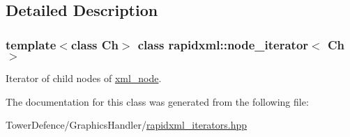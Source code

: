 \subsection{Detailed Description}
\subsubsection*{template$<$class Ch$>$\newline
class rapidxml\+::node\+\_\+iterator$<$ Ch $>$}

Iterator of child nodes of \mbox{\hyperlink{classrapidxml_1_1xml__node}{xml\+\_\+node}}. 

The documentation for this class was generated from the following file\+:\begin{DoxyCompactItemize}
\item 
Tower\+Defence/\+Graphics\+Handler/\mbox{\hyperlink{rapidxml__iterators_8hpp}{rapidxml\+\_\+iterators.\+hpp}}\end{DoxyCompactItemize}
